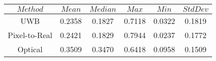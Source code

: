 \begin{table}[h]
\centering
\begin{tabular}{|c|c|c|c|c|c|}
\hline
$Method$ & $Mean$ & $Median$ & $Max$ & $Min$ & $StdDev$ \\
\hline
UWB & 0.2358 & 0.1827 & 0.7118 & 0.0322 & 0.1819 \\
\hline
Pixel-to-Real & 0.2421 & 0.1829 & 0.7944 & 0.0237 & 0.1772 \\
\hline
Optical & 0.3509 & 0.3470 & 0.6418 & 0.0958 & 0.1509 \\
\hline
\end{tabular}
\end{table}
